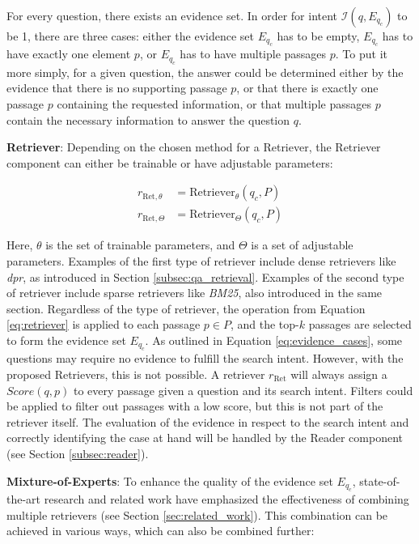 For every question, there exists an evidence set. In order for intent $\mathcal{I}(q,E_{q_c})$ to be 1, there are three cases: either the evidence set $E_{q_c}$ has to be empty, $E_{q_c}$ has to have exactly one element $p$, or $E_{q_c}$ has to have multiple passages $p$. To put it more simply, for a given question, the answer could be determined either by the evidence that there is no supporting passage $p$, or that there is exactly one passage $p$ containing the requested information, or that multiple passages $p$ contain the necessary information to answer the question $q$.

\vspace{\baselineskip}

\textbf{Retriever}: Depending on the chosen method for a Retriever, the Retriever component can either be trainable or have adjustable parameters:

\begin{align}
    r_{\text{Ret}, \theta} &= \text{Retriever}_\theta(q_c, P) \\
    r_{\text{Ret}, \Theta} &= \text{Retriever}_\Theta(q_c, P)
\end{align}

Here, $\theta$ is the set of trainable parameters, and $\Theta$ is a set of adjustable parameters. Examples of the first type of retriever include dense retrievers like \textit{\gls{dpr}}, as introduced in Section \ref{subsec:qa_retrieval}. Examples of the second type of retriever include sparse retrievers like \textit{BM25}, also introduced in the same section. Regardless of the type of retriever, the operation from Equation \ref{eq:retriever} is applied to each passage $p \in P$, and the top-$k$ passages are selected to form the evidence set $E_{q_c}$. As outlined in Equation \ref{eq:evidence_cases}, some questions may require no evidence to fulfill the search intent. However, with the proposed Retrievers, this is not possible. A retriever $r_{\text{Ret}}$ will always assign a $Score(q,p)$ to every passage given a question and its search intent. Filters could be applied to filter out passages with a low score, but this is not part of the retriever itself. The evaluation of the evidence in respect to the search intent and correctly identifying the case at hand will be handled by the Reader component (see Section \ref{subsec:reader}).

\vspace{\baselineskip}

\textbf{Mixture-of-Experts}: To enhance the quality of the evidence set $E_{q_c}$, state-of-the-art research and related work have emphasized the effectiveness of combining multiple retrievers (see Section \ref{sec:related_work}). This combination can be achieved in various ways, which can also be combined further:

